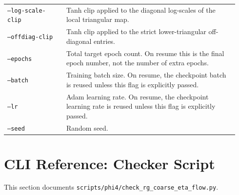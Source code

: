 \documentclass[11pt]{article}
\begin{document}
\begin{longtable}{p{0.24\linewidth}p{0.70\linewidth}}
\texttt{--log-scale-clip} & Tanh clip applied to the diagonal log-scales of the local triangular map. \\
\texttt{--offdiag-clip} & Tanh clip applied to the strict lower-triangular off-diagonal entries. \\
\texttt{--epochs} & Total target epoch count. On resume this is the final epoch number, not the number of extra epochs. \\
\texttt{--batch} & Training batch size. On resume, the checkpoint batch is reused unless this flag is explicitly passed. \\
\texttt{--lr} & Adam learning rate. On resume, the checkpoint learning rate is reused unless this flag is explicitly passed. \\
\texttt{--seed} & Random seed. \\
\bottomrule
\end{longtable}

\section{CLI Reference: Checker Script}

This section documents
\texttt{scripts/phi4/check\_rg\_coarse\_eta\_flow.py}.
\end{document}
